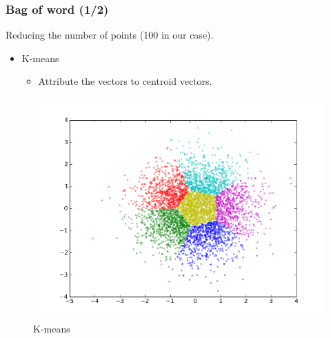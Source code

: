 \documentclass[xcolor=table]{beamer}
\begin{document}
\begin{frame} \frametitle{Bag of word (1/2)}


Reducing the number of points (100 in our case).

\begin{itemize}
    \item K-means
    \begin{itemize}
        \item Attribute the vectors to centroid vectors.
    \end{itemize}
\end{itemize}

\begin{figure}[h]
        \centering
        \includegraphics[scale=0.25]{k6n5000.png}
        \caption{K-means}
        \label{fig:kmeans}
    \end{figure}

\end{frame}
\end{document}
